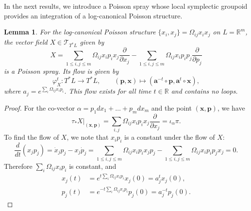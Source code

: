 \documentclass{amsart}
\newtheorem{lemma}[theorem]{Lemma}
\numberwithin{equation}{section}
\newcommand{\bfa}{\mathbf{a}}
\newcommand{\bfp}{\mathbf{p}}
\newcommand{\bfx}{\mathbf{x}}
\newcommand{\cT}{\mathcal{T}}
\newcommand{\RR}{\mathbb{R}}
\begin{document}
In the next results, we introduce a Poisson spray whose local symplectic groupoid provides an integration of a log-canonical Poisson structure.
\begin{lemma}
  For the log-canonical Poisson structure $\{x_i, x_j\} = \Omega_{ij} x_i x_j$ on $L = \RR^m$, the vector field $X \in \cT_{T^*L}$ given by
  \begin{equation} 
    \label{eq: PoisSp}
    X = \sum_{1 \leq i,j \leq m}\Omega_{ij}x_i p_i x_j\frac{\partial}{\partial x_j} - \sum_{1 \leq i,j \leq m}\Omega_{ij}x_ip_i p_j\frac{\partial}{\partial p_j}
  \end{equation}
  is a Poisson spray.
  Its flow is given by
  \[\varphi_X^t: T^*L \to T^*L, \qquad (\bfp, \bfx) \mapsto (\bfa^{-t} \circ \bfp, \bfa^t \circ \bfx),\]
  where $a_j = e^{\sum_i \Omega_{ij} x_ip_i}$.
  This flow exists for all time $t \in \RR$ and contains no loops.
\end{lemma}

\begin{proof}
	For the co-vector $\alpha = p_1 dx_1 + \ldots + p_m dx_m$ and the point $(\mathbf{x}, \mathbf{p})$, we have
	\[
		\tau_* X|_{(\mathbf{x},\mathbf{p})} = \sum_{i, j}\Omega_{ij} x_i p_i x_j \frac{\partial}{\partial x_j} = \iota_\alpha \pi.
	\]
	To find the flow of $X$, we note that $x_i p_i$ is a constant under the flow of $X$:
	\[
		\frac{d}{dt}(x_j p_j) = \dot{x}_j p_j - x_j \dot{p}_j = \sum_{1 \leq i,j \leq m}\Omega_{ij}x_i p_i x_j p_j - \sum_{1 \leq i,j \leq m}\Omega_{ij}x_ip_i p_j x_j = 0.
	\]
	Therefore $\sum_{i}\Omega_{ij}x_i p_i$ is constant, and
	\begin{align*}
		x_j(t) & = e^{t \sum_i \Omega_{ij} x_ip_i} x_j(0) = a_j^t x_j(0), \\
		p_j(t) & = e^{-t \sum_i \Omega_{ij} x_ip_i} p_j(0) = a_j^{-t} p_j(0).
	\end{align*}
\end{proof}
\end{document}

